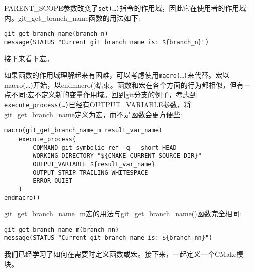 PARENT\_SCOPE参数改变了\texttt{set(…)}指令的作用域，因此它在使用者的作用域内。git\_get\_branch\_name函数的用法如下:

\begin{lstlisting}[style=styleCMake]
git_get_branch_name(branch_n)
message(STATUS "Current git branch name is: ${branch_n}")
\end{lstlisting}

接下来看下宏。


如果函数的作用域理解起来有困难，可以考虑使用\texttt{macro(…)}来代替。宏以macro(…)开始，以endmacro()结束。函数和宏在各个方面的行为都相似，但有一点不同:宏不定义新的变量作用域。回到git分支的例子，考虑到\texttt{execute\_process(…)}已经有OUTPUT\_VARIABLE参数，将git\_get\_branch\_name定义为宏，而不是函数会更方便些:

\begin{lstlisting}[style=styleCMake]
macro(git_get_branch_name_m result_var_name)
	execute_process(
		COMMAND git symbolic-ref -q --short HEAD
		WORKING_DIRECTORY "${CMAKE_CURRENT_SOURCE_DIR}"
		OUTPUT_VARIABLE ${result_var_name}
		OUTPUT_STRIP_TRAILING_WHITESPACE
		ERROR_QUIET
	)
endmacro()
\end{lstlisting}

git\_get\_branch\_name\_m宏的用法与git\_get\_branch\_name()函数完全相同:

\begin{lstlisting}[style=styleCMake]
git_get_branch_name_m(branch_nn)
message(STATUS "Current git branch name is: ${branch_nn}")
\end{lstlisting}

我们已经学习了如何在需要时定义函数或宏。接下来，一起定义一个CMake模块。


